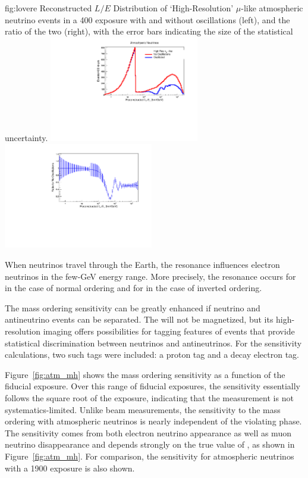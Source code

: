 \begin{dunefigure}
{fig:lovere}
{Reconstructed $L/E$ Distribution of `High-Resolution'
$\mu$-like atmospheric neutrino events in a \SI{400}{\ktyr} exposure with and
without oscillations (left), and the ratio of the two (right), with the error bars indicating the size of the statistical uncertainty.}
\includegraphics[width=0.49\textwidth]{graphics/atm_spectrum_LoverE_400.pdf}
\includegraphics[width=0.49\textwidth]{graphics/atm_spectrum_LoverE_400_2.pdf}
\end{dunefigure}

When neutrinos travel through the Earth, the  resonance influences 
electron neutrinos in the few-\si{GeV} energy range. More precisely, the resonance 
occurs for \nue in the case of normal ordering and for \anue in the case of inverted ordering.

The mass ordering sensitivity can be greatly enhanced if neutrino and antineutrino events can be 
separated. The   will not be magnetized, but its high-resolution 
imaging offers possibilities for tagging features of events that provide statistical 
discrimination between neutrinos and antineutrinos. For the sensitivity calculations, 
two such tags were included: a proton tag and a decay electron tag. 

Figure~\ref{fig:atm_mh} shows the mass ordering sensitivity as a function of the fiducial exposure.  Over this range of fiducial exposures, the sensitivity essentially follows the square root of the exposure, indicating that the measurement is not systematics-limited. Unlike beam measurements, the sensitivity to the mass ordering with atmospheric neutrinos is nearly independent of the  violating phase.  The sensitivity comes from both electron neutrino appearance as well as muon neutrino disappearance and depends strongly on the true value of , as shown in Figure~\ref{fig:atm_mh}. For comparison, the sensitivity for \hyperk atmospheric neutrinos with a \SI{1900}{\ktyr} exposure is also shown.

